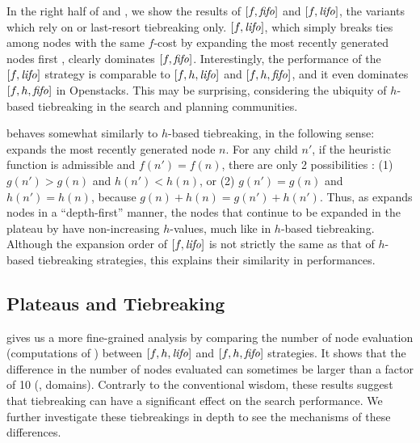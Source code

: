 \label{sec:h-necessary}

In the right half of  and
, we show the results of $[f, {\mbox{\textit{fifo}}}]$ and
$[f, {\mbox{\textit{lifo}}}]$, the \astar variants which rely on \fifo or \lifo
last-resort tiebreaking only.  $[f,{\mbox{\textit{lifo}}}]$, which simply breaks ties
among nodes with the same $f$-cost by expanding the most recently
generated nodes first \cite{korf1985depth}, clearly dominates
$[f,{\mbox{\textit{fifo}}}]$.  Interestingly, the performance of the $[f,{\mbox{\textit{lifo}}}]$ strategy
is comparable to $[f,h,{\mbox{\textit{lifo}}}]$ and $[f,h,{\mbox{\textit{fifo}}}]$, and it even dominates
$[f,h,{\mbox{\textit{fifo}}}]$ in Openstacks.
This may be surprising, considering the ubiquity of $h$-based tiebreaking in the search and planning communities.

\lifo behaves somewhat similarly to $h$-based tiebreaking, in the following sense:
\lifo expands the most recently generated node $n$.
For any child $n'$, 
if the heuristic function is admissible and $f(n') = f(n)$, there are only 2 possibilities :
(1) $g(n') > g(n)$ and $h(n') < h(n)$, or
(2) $g(n') = g(n)$ and $h(n') = h(n)$,
because $g(n)+h(n)=g(n')+h(n')$.
Thus, as \lifo expands nodes in a ``depth-first'' manner,
the nodes that continue to be expanded in the plateau by \lifo have non-increasing $h$-values,
much like in $h$-based tiebreaking.
Although the expansion order of $[f,{\mbox{\textit{lifo}}}]$ is not strictly the same as that of $h$-based tiebreaking strategies,
this explains their similarity in performances.


\subsection{Plateaus and Tiebreaking}

 gives us a
more fine-grained analysis by comparing the number of node evaluation
(computations of \lmcut) between $[f,h,{\mbox{\textit{lifo}}}]$ and $[f,h,{\mbox{\textit{fifo}}}]$ strategies.
It shows that the difference in the number of nodes
evaluated can sometimes be larger than a factor of 10 (,  domains).
Contrarly to the conventional wisdom, 
these results suggest that tiebreaking can have a significant effect on
the search performance. 
We further investigate these tiebreakings in depth to see the mechanisms of
these differences.

